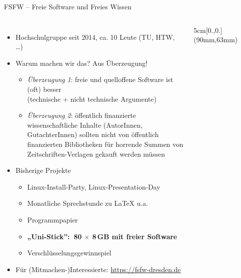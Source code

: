 \documentclass{beamer}
\begin{document}
\begin{frame}{FSFW – Freie Software und Freies Wissen}

  \begin{columns}

\vspace{-5mm}
  \begin{itemize}
  \item Hochschulgruppe seit 2014, ca. 10 Leute (TU, HTW, …)
  \item Warum machen wir das? Aus Überzeugung!

  \begin{itemize}
  \item \emph{Überzeugung 1}: freie und quelloffene Software ist (oft) besser\\
    (technische + nicht technische Argumente)\\
    \bigskip
    \pause
  \item \emph{Überzeugung 2}: öffentlich finanzierte wissenschaftliche Inhalte
    (AutorInnen, GutachterInnen) sollten nicht von öffentlich finanzierten
    Bibliotheken für horrende Summen von Zeitschriften-Verlagen gekauft werden
    müssen
  \end{itemize}

    \pause
  \item Bisherige Projekte
    \begin{itemize}
    \item Linux-Install-Party, Linux-Presentation-Day
    \item Monatliche Sprechstunde zu \LaTeX{} u.a.
    \item Programmpapier
    \item \textbf<4-5>{„Uni-Stick”:~80 $\times$ 8\,GB mit freier Software}
    \item Verschlüsselungsgewinnspiel
    \end{itemize}
    \pause
    \pause
    \pause
    \item Für (Mitmachen-)Interessierte: \url{https://fsfw-dresden.de}
  \end{itemize}

\begin{textblock*}{5cm}[0.,0.](90mm,63mm)
\end{textblock*}

~
\end{columns}
\end{frame}
\end{document}
